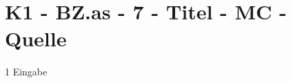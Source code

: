 \section{K1 - BZ.as - 7 - Titel - MC - Quelle}

\begin{langesbeispiel} \item[1] %
Eingabe
\end{langesbeispiel}